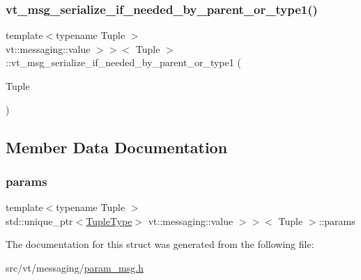\subsubsection{\texorpdfstring{vt\+\_\+msg\+\_\+serialize\+\_\+if\+\_\+needed\+\_\+by\+\_\+parent\+\_\+or\+\_\+type1()}{vt\_msg\_serialize\_if\_needed\_by\_parent\_or\_type1()}}
{\footnotesize\ttfamily template$<$typename Tuple $>$ \\
vt\+::messaging\+::value $>$$>$$<$ Tuple $>$\+::vt\+\_\+msg\+\_\+serialize\+\_\+if\+\_\+needed\+\_\+by\+\_\+parent\+\_\+or\+\_\+type1 (\begin{DoxyParamCaption}\item[{Tuple}]{ }\end{DoxyParamCaption})}



\subsection{Member Data Documentation}
\mbox{\label{structvt_1_1messaging_1_1_param_msg_3_01_tuple_00_01std_1_1enable__if__t_3_01not_01is__byte__copae27aaaf2bf1aaed1864cee3aebbc774_a0bed46ca731b6d0b81abee26ae3f73a0}} 
\subsubsection{\texorpdfstring{params}{params}}
{\footnotesize\ttfamily template$<$typename Tuple $>$ \\
std\+::unique\+\_\+ptr$<$\hyperlink{structvt_1_1messaging_1_1_param_msg_3_01_tuple_00_01std_1_1enable__if__t_3_01not_01is__byte__copae27aaaf2bf1aaed1864cee3aebbc774_a63c0c672da0bf7b284da9647aad497f8}{Tuple\+Type}$>$ vt\+::messaging\+::value $>$$>$$<$ Tuple $>$\+::params}



The documentation for this struct was generated from the following file\+:\begin{DoxyCompactItemize}
\item 
src/vt/messaging/\hyperlink{param__msg_8h}{param\+\_\+msg.\+h}\end{DoxyCompactItemize}
